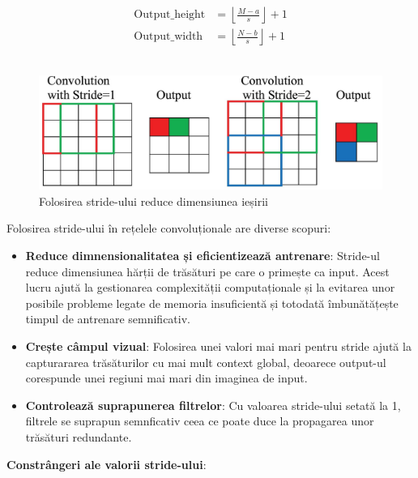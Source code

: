 \begin{equation}
    \begin{aligned}
        \text{Output\_height} &= \left\lfloor \frac{M - a}{s} \right\rfloor + 1 \\
        \text{Output\_width} &= \left\lfloor \frac{N - b}{s} \right\rfloor + 1
    \end{aligned}
    \label{stride}
\end{equation}
\\
\begin{figure}[h]
         \centering 
         \includegraphics[width=0.85\linewidth]{images/stride.jpg}
         \captionsetup{font=footnotesize}
         \caption{Folosirea stride-ului reduce dimensiunea ieșirii\cite{stride}}
\end{figure}

Folosirea stride-ului în rețelele convoluționale are diverse scopuri:

\begin{itemize}
    \item \textbf{Reduce dimnensionalitatea și eficientizează antrenare}: Stride-ul reduce dimensiunea hărții de trăsături pe care o primește ca input. Acest lucru ajută la gestionarea complexității computaționale și la evitarea unor posibile probleme legate de memoria insuficientă și totodată îmbunătățește timpul de antrenare semnificativ.

    \item \textbf{Crește câmpul vizual}: Folosirea unei valori mai mari pentru stride ajută la capturararea trăsăturilor cu mai mult context global, deoarece output-ul corespunde unei regiuni mai mari din imaginea de input. 

    \item \textbf{Controlează suprapunerea filtrelor}: Cu valoarea stride-ului setată la 1, filtrele se suprapun semnficativ ceea ce poate duce la propagarea unor trăsături redundante. 
\end{itemize}

\textbf{Constrângeri ale valorii stride-ului}:

